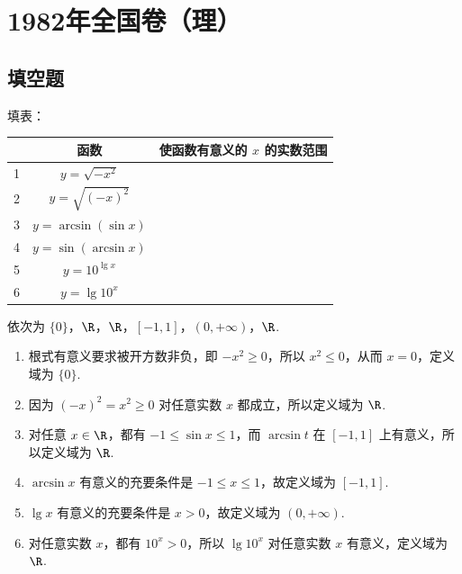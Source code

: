 \chapter{1982年全国卷（理）}

\section{填空题}

\begin{problem}

填表：

\begin{center}
\renewcommand{\arraystretch}{1.2}
\setlength{\tabcolsep}{6pt}
\begin{tabular}{|c|c|c|}
\hline
 & 函数 & 使函数有意义的 \(x\) 的实数范围 \\
\hline
1 & \(y=\sqrt{-x^2}\) &\fillinblank{} \\
\hline
2 & \(y=\sqrt{(-x)^2}\) &\fillinblank{} \\
\hline
3 & \(y=\arcsin(\sin x)\) &\fillinblank{} \\
\hline
4 & \(y=\sin(\arcsin x)\) &\fillinblank{} \\
\hline
5 & \(y=10^{\lg x}\) &\fillinblank{} \\
\hline
6 & \(y=\lg 10^x\) &\fillinblank{} \\
\hline
\end{tabular}
\end{center}
\end{problem}

\begin{answer}
依次为 \(\{0\}\)，\(\R\)，\(\R\)，\([-1,1]\)，\((0,+\infty)\)，\(\R\).
\end{answer}

\begin{solution}
\begin{enumerate}
\item 根式有意义要求被开方数非负，即 \(-x^2\geqslant0\)，所以 \(x^2\leqslant0\)，从而 \(x=0\)，定义域为 \(\{0\}\).
\item 因为 \((-x)^2=x^2\geqslant0\) 对任意实数 \(x\) 都成立，所以定义域为 \(\R\).
\item 对任意 \(x\in\R\)，都有 \(-1\leqslant\sin x\leqslant1\)，而 \(\arcsin t\) 在 \([-1,1]\) 上有意义，所以定义域为 \(\R\).
\item \(\arcsin x\) 有意义的充要条件是 \(-1\leqslant x\leqslant1\)，故定义域为 \([-1,1]\).
\item \(\lg x\) 有意义的充要条件是 \(x>0\)，故定义域为 \((0,+\infty)\).
\item 对任意实数 \(x\)，都有 \(10^x>0\)，所以 \(\lg 10^x\) 对任意实数 \(x\) 有意义，定义域为 \(\R\).
\end{enumerate}
\end{solution}

